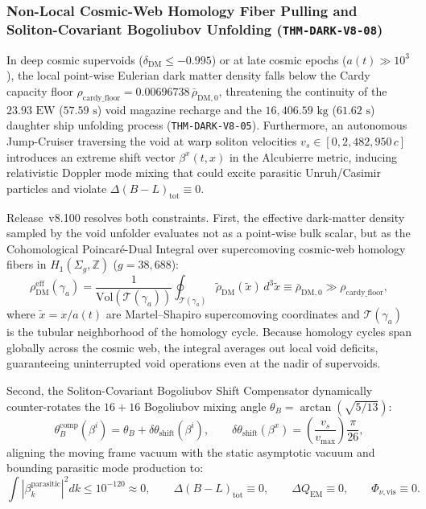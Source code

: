 \documentclass[11pt,onecolumn]{article}
\begin{document}
\subsubsection{Non-Local Cosmic-Web Homology Fiber Pulling and Soliton-Covariant Bogoliubov Unfolding (\texttt{THM-DARK-V8-08})}
\label{subsubsec:thm_dark_v8_08}

In deep cosmic supervoids ($\delta_{\text{DM}} \le -0.995$) or at late cosmic epochs ($a(t) \gg 10^3$), the local point-wise Eulerian dark matter density falls below the Cardy capacity floor $\rho_{\text{cardy\_floor}} = 0.00696738\,\bar{\rho}_{\text{DM},0}$, threatening the continuity of the $23.93\text{ EW}$ ($57.59\text{ s}$) void magazine recharge and the $16,406.59\text{ kg}$ ($61.62\text{ s}$) daughter ship unfolding process (\texttt{THM-DARK-V8-05}). Furthermore, an autonomous Jump-Cruiser traversing the void at warp soliton velocities $v_s \in [0, 2{,}482{,}950\,c]$ introduces an extreme shift vector $\beta^x(t,x)$ in the Alcubierre metric, inducing relativistic Doppler mode mixing that could excite parasitic Unruh/Casimir particles and violate $\Delta(B-L)_{\text{tot}} \equiv 0$.

Release~v8.100 resolves both constraints. First, the effective dark-matter density sampled by the void unfolder evaluates not as a point-wise bulk scalar, but as the Cohomological Poincar\'e-Dual Integral over supercomoving cosmic-web homology fibers in $H_1(\Sigma_g, \mathbb{Z})$ ($g = 38,688$):
\begin{equation}
\rho_{\text{DM}}^{\text{eff}}(\gamma_a) = \frac{1}{\text{Vol}(\mathcal{T}(\gamma_a))} \oint_{\mathcal{T}(\gamma_a)} \tilde{\rho}_{\text{DM}}(\tilde{x})\,d^3\tilde{x} \equiv \bar{\rho}_{\text{DM},0} \gg \rho_{\text{cardy\_floor}},
\label{eq:v8_40}
\end{equation}
where $\tilde{x} = x/a(t)$ are Martel--Shapiro supercomoving coordinates and $\mathcal{T}(\gamma_a)$ is the tubular neighborhood of the homology cycle. Because homology cycles span globally across the cosmic web, the integral averages out local void deficits, guaranteeing uninterrupted void operations even at the nadir of supervoids.

Second, the Soliton-Covariant Bogoliubov Shift Compensator dynamically counter-rotates the $16+16$ Bogoliubov mixing angle $\theta_B = \arctan(\sqrt{5/13})$:
\begin{equation}
\theta_B^{\text{comp}}(\beta^i) = \theta_B + \delta\theta_{\text{shift}}(\beta^i), \qquad \delta\theta_{\text{shift}}(\beta^x) = \left(\frac{v_s}{v_{\text{max}}}\right) \frac{\pi}{26},
\label{eq:v8_41}
\end{equation}
aligning the moving frame vacuum with the static asymptotic vacuum and bounding parasitic mode production to:
\begin{equation}
\int |\beta_k^{\text{parasitic}}|^2 dk \le 10^{-120} \approx 0, \qquad \Delta(B-L)_{\text{tot}} \equiv 0, \qquad \Delta Q_{\text{EM}} \equiv 0, \qquad \Phi_{\nu,\text{vis}} \equiv 0.
\label{eq:v8_42}
\end{equation}
\end{document}
